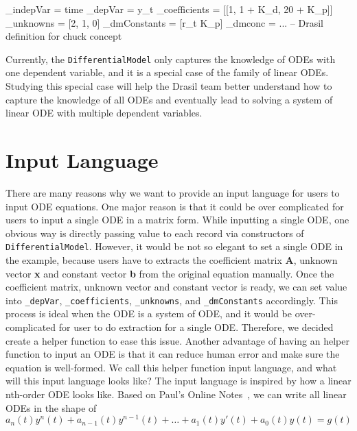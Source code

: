 \begin{listing}[ht]
\begin{haskell1}
_indepVar = time
_depVar = y_t
_coefficients = [[1, 1 + K_d, 20 + K_p]]
_unknowns = [2, 1, 0]
_dmConstants = [r_t K_p]
_dmconc = ... -- Drasil definition for chuck concept
\end{haskell1}
\label{code_interaldata}
\end{listing}

Currently, the \verb|DifferentialModel| only captures the knowledge of ODEs with one dependent variable, and it is a special case of the family of linear ODEs. Studying this special case will help the Drasil team better understand how to capture the knowledge of all ODEs and eventually lead to solving a system of linear ODE with multiple dependent variables.

\section{Input Language}
\label{sec_input}
There are many reasons why we want to provide an input language for users to input ODE equations. One major reason is that it could be over complicated for users to input a single ODE in a matrix form. While inputting a single ODE, one obvious way is directly passing value to each record via constructors of \verb|DifferentialModel|. However, it would be not so elegant to set a single ODE in the example, because users have to extracts the coefficient matrix \textbf{A}, unknown vector \textbf{x} and constant vector \textbf{b} from the original equation manually. Once the coefficient matrix, unknown vector and constant vector is ready, we can set value into \verb|_depVar|, \verb|_coefficients|, \verb|_unknowns|, and \verb|_dmConstants| accordingly. This process is ideal when the ODE is a system of ODE, and it would be over-complicated for user to do extraction for a single ODE. Therefore, we decided create a helper function to ease this issue. Another advantage of having an helper function to input an ODE is that it can reduce human error and make sure the equation is well-formed. We call this helper function input language, and what will this input language looks like? The input language is inspired by how a linear nth-order ODE looks like. Based on Paul's Online Notes~\citep{paullinearode}, we can write all linear ODEs in the shape of 
\begin{equation} \label{eq_linearDE}
	a_n(t)y^n(t) + a_{n-1}(t)y^{n-1}(t) + \dots + a_1(t)y'(t) + a_0(t)y(t) = g(t)
\end{equation}

